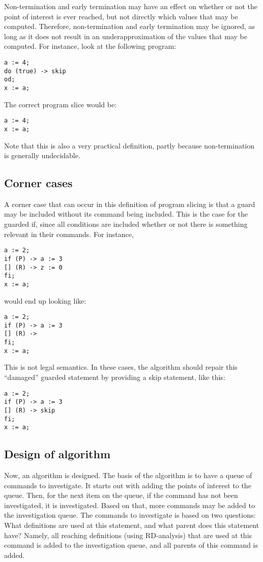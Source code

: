 Non-termination and early termination may have an effect on whether or not the point of interest is
ever reached, but not directly which values that may be computed. Therefore, non-termination and
early termination may be ignored, as long as it does not result in an underapproximation of the
values that may be computed. For instance, look at the following program:
\begin{lstlisting}
a := 4;
do (true) -> skip
od;
x := a;
\end{lstlisting}
The correct program slice would be:
\begin{lstlisting}
a := 4;
x := a;
\end{lstlisting}
Note that this is also a very practical definition, partly because non-termination is generally
undecidable.

\subsection{Corner cases}

A corner case that can occur in this definition of program slicing is that a guard may be included
without its command being included.
This is the case for the guarded if, since all conditions are included whether or not there is
something relevant in their commands. For instance,
\begin{lstlisting}
a := 2;
if (P) -> a := 3
[] (R) -> z := 0
fi;
x := a;
\end{lstlisting}
would end up looking like:
\begin{lstlisting}
a := 2;
if (P) -> a := 3
[] (R) ->
fi;
x := a;
\end{lstlisting}
This is not legal semantics. In these cases, the algorithm should repair this “damaged” guarded
statement by providing a skip statement, like this:
\begin{lstlisting}
a := 2;
if (P) -> a := 3
[] (R) -> skip
fi;
x := a;
\end{lstlisting}

\subsection{Design of algorithm}

Now, an algorithm is designed. The basis of the algorithm is to have a queue of commands to
investigate. It starts out with adding the points of interest to the queue. Then, for the next
item on the queue, if the command has not been investigated, it is investigated. Based on that,
more commands may be added to the investigation queue. The commands to investigate is based
on two questions: What definitions are used at this statement, and what parent does this statement
have? Namely, all reaching definitions (using RD-analysis) that are used at this command is added
to the investigation queue, and all parents of this command is added.

